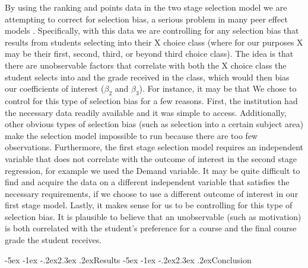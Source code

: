 \documentclass[12pt,a4paper,english,fleqn]{article}
\makeatletter
\renewcommand\section{\@startsection{section}{1}{\z@}
{-5ex \@plus -1ex \@minus -.2ex}{2.3ex \@plus.2ex}{\normalfont\large\bf}}
\makeatother
\begin{document}
By using the ranking and points data in the two stage selection model we are attempting to correct for selection bias, a serious problem in many peer effect models \citep{carman2012classroom,betts2003determinants,ding2007peers}. 
Specifically, with this data we are controlling for any selection bias that results from students selecting into their X choice class (where for our purposes X may be their first, second, third, or beyond third choice class). 
The idea is that there are unobservable factors that correlate with both the X choice class the student selects into and the grade received in the class, which would then bias our coefficients of interest ($\beta_{2}$ and $\beta_{3}$). 
For instance, it may be that 
We chose to control for this type of selection bias for a few reasons. 
First, the institution had the necessary data readily available and it was simple to access. 
Additionally, other obvious types of selection bias (such as selection into a certain subject area) make the selection model impossible to run because there are too few observations. 
Furthermore, the first stage selection model requires an independent variable that does not correlate with the outcome of interest in the second stage regression, for example we used the Demand variable. 
It may be quite difficult to find and acquire the data on a different independent variable that satisfies the necessary requirements, if we choose to use a different outcome of interest in our first stage model. 
Lastly, it makes sense for us to be controlling for this type of selection bias. 
It is plausible to believe that an unobservable (such as motivation) is both correlated with the student's preference for a course and the final course grade the student receives. 

\section{Results}\label{results}
\section{Conclusion}\label{Conclusion}
             
\newpage{}

\singlespacing


\end{document}
